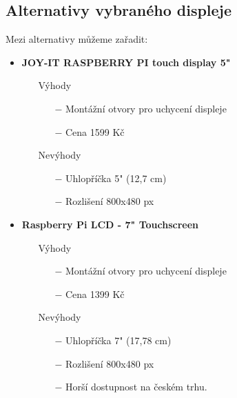 \subsection{Alternativy vybraného displeje}
Mezi alternativy můžeme zařadit:
\begin{itemize}
    \item \textbf{JOY-IT RASPBERRY PI touch display 5"}
    \begin{itemize}
    \item[] Výhody
        \begin{itemize}
            \item[$-$] Montážní otvory pro uchycení displeje
            \item[$-$] Cena 1599 Kč
        \end{itemize}
    \item[] Nevýhody
        \begin{itemize}
            \item[$-$] Uhlopříčka 5" (12,7 cm)
            \item[$-$] Rozlišení 800x480 px
        \end{itemize}
    \end{itemize}
    \item \textbf{Raspberry Pi LCD - 7" Touchscreen}
    \begin{itemize}
    \item[] Výhody
        \begin{itemize}
            \item[$-$] Montážní otvory pro uchycení displeje
            \item[$-$] Cena 1399 Kč
        \end{itemize}
    \item[] Nevýhody
        \begin{itemize}
            \item[$-$] Uhlopříčka 7" (17,78 cm)
            \item[$-$] Rozlišení 800x480 px
            \item[$-$] Horší dostupnost na českém trhu.
        \end{itemize}
    \end{itemize}


\end{itemize}





